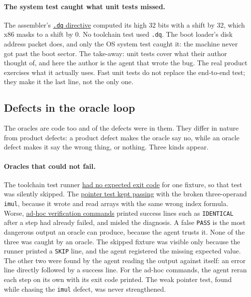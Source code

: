 \documentclass{article}
\newcommand{\defect}[2]{\href{\siteurl/defects.html\##1}{#2}}
\begin{document}
\paragraph{The system test caught what unit tests missed.} The assembler's
\defect{D-C08-08}{\texttt{.dq} directive} computed its high 32 bits with a shift by 32, which x86 masks to a
shift by 0. No toolchain test used \texttt{.dq}. The boot loader's disk address packet
does, and only the OS system test caught it: the machine never got past the boot sector.
The take-away: unit tests cover what their author thought of, and here the author is the
agent that wrote the bug. The real product exercises what it actually uses. Fast unit
tests do not replace the end-to-end test; they make it the last line, not the only one.

\subsection{Defects in the oracle loop}\label{sec:oracledefects}

The oracles are code too and \ntoracle{} of the defects were
in them. They differ in nature from product defects: a product defect makes the oracle
say no, while an oracle defect makes it say the wrong thing, or nothing. Three kinds
appear.

\paragraph{Oracles that could not fail.} The toolchain test runner
\defect{D-C03-18}{had no expected exit code} for one fixture, so that test was silently
skipped. The \defect{D-C04-13}{pointer test kept passing} with the broken three-operand
\texttt{imul}, because it wrote and read arrays with the same wrong index formula. Worse,
\defect{D-C04-17}{ad-hoc verification commands} printed success lines such as
\texttt{IDENTICAL} after a step had already failed, and misled the diagnosis. A
false \texttt{PASS} is the most dangerous output an oracle can produce, because the agent
trusts it. None of the three was caught by an oracle. The skipped fixture was visible
only because the runner printed a \texttt{SKIP} line, and the agent registered the
missing expected value. The other two were found by the agent reading the output against
itself: an error line directly followed by a success line. For the ad-hoc commands, the
agent reran each step on its own with its exit code printed. The weak pointer test,
found while chasing the \texttt{imul} defect, was never strengthened.
\end{document}
